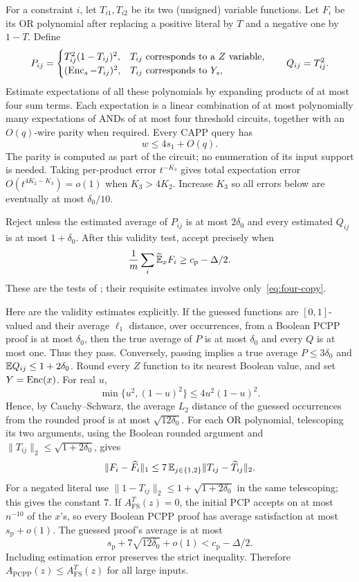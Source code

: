 For a constraint $i$, let $T_{i1},T_{i2}$ be its two (unsigned)
variable functions. Let $F_i$ be its OR polynomial after replacing
a positive literal by $T$ and a negative one by $1-T$. Define
\begin{equation}\label{eq:validity-polys}
 P_{ij}=\begin{cases}
 T_{ij}^2(1-T_{ij})^2,&T_{ij}\text{ corresponds to a }Z\text{ variable},\\
 (\operatorname{Enc}_s-T_{ij})^2,&T_{ij}\text{ corresponds to }Y_s,
 \end{cases}
 \qquad Q_{ij}=T_{ij}^2.
\end{equation}
Estimate expectations of all these polynomials by expanding products
of at most four sum terms. Each expectation is a linear combination
of at most polynomially many expectations of ANDs of at most four
threshold circuits, together with an $O(q)$-wire parity when required.
Every CAPP query has
\begin{equation}\label{eq:four-copy}
 w\le4s_1+O(q).
\end{equation}
The parity is computed as part of the circuit; no enumeration of its
input support is needed. Taking per-product error $t^{-K_3}$ gives
total expectation error $O(t^{4K_2-K_3})=o(1)$ when $K_3>4K_2$.
Increase $K_3$ so all errors below are eventually at most $\delta_0/10$.

Reject unless the estimated average of $P_{ij}$ is at most
$2\delta_0$ and every estimated $Q_{ij}$ is at most $1+\delta_0$.
After this validity test, accept precisely when
\begin{equation}\label{eq:avg-accept}
 \frac1m\sum_i\widetilde{\mathbb E}_x F_i
 \ge c_{\mathrm p}-\Delta/2.
\end{equation}
These are the tests of \cite[Section 6.2.2]{CLW20}; their requisite
estimates involve only~\eqref{eq:four-copy}.

Here are the validity estimates explicitly. If the guessed functions
are $[0,1]$-valued and their average $\ell_1$ distance, over occurrences,
from a Boolean PCPP proof is at most $\delta_0$, then the true average
of $P$ is at most $\delta_0$ and every $Q$ is at most one. Thus they
pass. Conversely, passing implies a true average $P\le3\delta_0$
and $\mathbb E Q_{ij}\le1+2\delta_0$. Round every $Z$ function to its
nearest Boolean value, and set $Y=\operatorname{Enc}(x)$. For real $u$,
\[
 \min\{u^2,(1-u)^2\}\le4u^2(1-u)^2.
\]
Hence, by Cauchy--Schwarz, the average $L_2$ distance of the guessed
occurrences from the rounded proof is at most
$\sqrt{12\delta_0}$. For each OR polynomial, telescoping its two
arguments, using the Boolean rounded argument and
$\|T_{ij}\|_2\le\sqrt{1+2\delta_0}$, gives
\[
 \|F_i-\widehat F_i\|_1
 \le7\,\mathbb E_{j\in\{1,2\}}\|T_{ij}-\widehat T_{ij}\|_2.
\]
For a negated literal use
$\|1-T_{ij}\|_2\le1+\sqrt{1+2\delta_0}$ in the same telescoping;
this gives the constant $7$. If
$A^T_{\mathrm{FS}}(z)=0$, the initial PCP accepts on at most $n^{-10}$
of the $x$'s, so every Boolean PCPP proof has average satisfaction
at most $s_{\mathrm p}+o(1)$. The guessed proof's average is at most
\[
 s_{\mathrm p}+7\sqrt{12\delta_0}+o(1)
 <c_{\mathrm p}-\Delta/2.
\]
Including estimation error preserves the strict inequality. Therefore
$A_{\mathrm{PCPP}}(z)\le A^T_{\mathrm{FS}}(z)$ for all large inputs.

